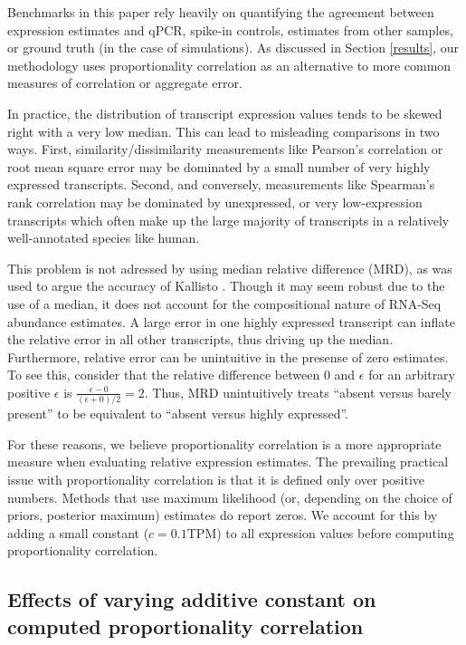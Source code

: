 \documentclass{article}
\begin{document}
Benchmarks in this paper rely heavily on quantifying the agreement between
expression estimates and qPCR, spike-in controls, estimates from other samples,
or ground truth (in the case of simulations). As discussed in Section
\ref{results}, our methodology uses proportionality correlation
\cite{Lovell:2015il} as an alternative to more common measures of correlation or
aggregate error.

In practice, the distribution of transcript expression values tends to be skewed
right with a very low median. This can lead to misleading comparisons in two
ways. First, similarity/dissimilarity measurements like Pearson's correlation or
root mean square error may be dominated by a small number of very highly
expressed transcripts. Second, and conversely, measurements like Spearman's rank
correlation may be dominated by unexpressed, or very low-expression transcripts
which often make up the large majority of transcripts in a relatively
well-annotated species like human.

This problem is not adressed by using median relative difference (MRD), as was used to
argue the accuracy of Kallisto \cite{Bray:2015uj}. Though it may seem robust due
to the use of a median, it does not account for the compositional nature of
RNA-Seq abundance estimates. A large error in one highly expressed transcript
can inflate the relative error in all other transcripts, thus driving up the
median. Furthermore, relative error can be unintuitive in the presense of
zero estimates. To see this, consider that the relative difference
between 0 and $\epsilon$ for an arbitrary positive $\epsilon$ is $\frac{\epsilon
- 0}{(\epsilon + 0)/2} = 2$. Thus, MRD unintuitively treats ``absent versus
barely present'' to be equivalent to ``absent versus highly expressed''.

For these reasons, we believe proportionality correlation is a more appropriate
measure when evaluating relative expression estimates.  The prevailing practical
issue with proportionality correlation is that it is defined only over positive
numbers. Methods that use maximum likelihood (or, depending on the choice of
priors, posterior maximum) estimates do report zeros.  We account for this by
adding a small constant ($c = 0.1 \text{TPM}$) to all expression values before
computing proportionality correlation.


\subsection{Effects of varying additive constant on computed proportionality
            correlation}\label{additive-constant}
\end{document}
